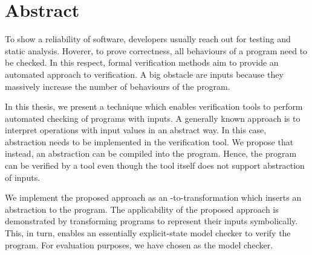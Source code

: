\chapter*{Abstract}

To show a reliability of software, developers usually reach out for testing
and static analysis. Hoverer, to prove correctness, all behaviours of a
program need to be checked. In this respect, formal verification methods aim to
provide an automated approach to verification. A big obstacle are inputs because they massively increase the number of behaviours of the program.

In this thesis, we present a technique which enables verification tools to
perform automated checking of programs with inputs. A generally known approach
is to interpret operations with input values in an abstract way. In this case,
abstraction needs to be implemented in the verification tool. We propose that
instead, an abstraction can be compiled into the program. Hence, the program
can be verified by a tool even though the tool itself does not support
abstraction of inputs.

We implement the proposed approach as an \LLVM-to-\LLVM transformation which
inserts an abstraction to the program. The applicability of the proposed
approach is demonstrated by transforming programs to represent their inputs
symbolically. This, in turn, enables an essentially explicit-state model checker
to verify the program. For evaluation purposes, we have chosen \DIVINE as the model checker.
